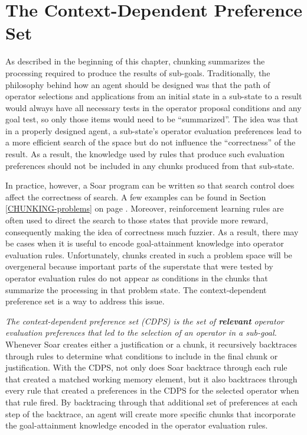 \section{The Context-Dependent Preference Set}
\label{CDPS}

As described in the beginning of this chapter, chunking summarizes the
processing required to produce the results of sub-goals.  Traditionally, the
philosophy behind how an agent should be designed was
that the path of operator selections and applications from an initial state in a
sub-state to a result would always have all necessary tests in the operator
proposal conditions and any goal test, so only those items would need to be
“summarized”. The idea was that in a properly designed agent, a sub-state's
operator evaluation preferences lead to a more efficient search of the space but
do not influence the “correctness” of the result. As a result, the knowledge
used by rules that produce such evaluation preferences should not be included
in any chunks produced from that sub-state.

In practice, however, a Soar program can be written so that search control does
affect the correctness of search.  A few examples can be found in Section
\ref{CHUNKING-problems} on page \pageref{CHUNKING-problems}.  Moreover,
reinforcement learning rules are often used to direct the search to those states
that provide more reward, consequently making the idea of correctness much
fuzzier.   As a result, there may be cases when it is useful to encode
goal-attainment knowledge into operator evaluation rules. Unfortunately, chunks
created in such a problem space will be overgeneral because important parts of
the superstate that were tested by operator evaluation rules do not appear as
conditions in the chunks that summarize the processing in that problem state.
The context-dependent preference set is a way to address this issue.

\emph{The context-dependent preference set (CDPS) is the set of
\textbf{relevant} operator evaluation preferences that led to the selection of
an operator in a sub-goal.} Whenever Soar creates either a justification or a
chunk, it recursively backtraces through rules to determine what conditions to include in the final chunk or justification.  With the CDPS, not only does Soar backtrace through each rule that created a matched working
memory element, but it also backtraces through every rule that
created a preferences in the CDPS for the selected operator when that rule fired. By
backtracing through that additional set of preferences at each step of the
backtrace, an agent will create more specific chunks that incorporate the
goal-attainment knowledge encoded in the operator evaluation rules.

